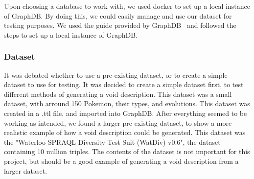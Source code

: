 Upon choosing a database to work with, we used docker to set up a local instance of GraphDB. By doing this, we could easily manage and use our dataset for testing purposes. We used the guide provided by GraphDB~\cite{docker-graphDB} and followed the steps to set up a local instance of GraphDB.



\subsubsection{Dataset}\label{sec:dataset}

It was debated whether to use a pre-existing dataset, or to create a simple dataset to use for testing. It was decided to create a simple dataset first, to test different methods of generating a \gls{void} description. This dataset was a small dataset, with arround 150 Pokemon, their types, and evolutions. This dataset was created in a .ttl file, and imported into GraphDB.
After everything seemed to be working as intended, we found a larger pre-existing dataset, to show a more realistic example of how a \gls{void} description could be generated. This dataset was the "Waterloo SPRAQL Diversity Test Suit (WatDiv) v0.6", the dataset containing 10 million triples. The contents of the dataset is not important for this project, but should be a good example of generating a void description from a larger dataset.

